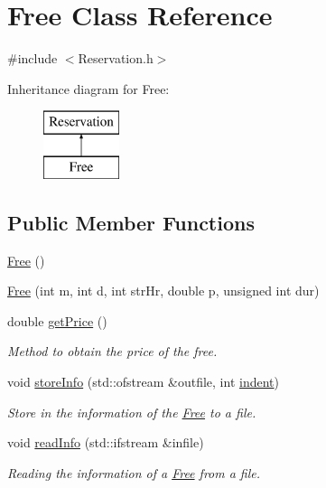 \hypertarget{class_free}{}\section{Free Class Reference}
\label{class_free}


{\ttfamily \#include $<$Reservation.\+h$>$}

Inheritance diagram for Free\+:\begin{figure}[H]
\begin{center}
\leavevmode
\includegraphics[height=2.000000cm]{class_free}
\end{center}
\end{figure}
\subsection*{Public Member Functions}
\begin{DoxyCompactItemize}
\item 
\mbox{\hyperlink{class_free_a4a847fee0a934284fc4581282706e885}{Free}} ()
\item 
\mbox{\hyperlink{class_free_add02897be555344a947ad860ab73e679}{Free}} (int m, int d, int str\+Hr, double p, unsigned int dur)
\item 
double \mbox{\hyperlink{class_free_a229f009a7535eeba0a6ff4495de8c6bf}{get\+Price}} ()
\begin{DoxyCompactList}\small\item\em Method to obtain the price of the free. \end{DoxyCompactList}\item 
void \mbox{\hyperlink{class_free_a5eec9da16ebf4f388d16dd270bd93b64}{store\+Info}} (std\+::ofstream \&outfile, int \mbox{\hyperlink{class_reservation_a480981ed050bae19bc74bbb0bbb459f9}{indent}})
\begin{DoxyCompactList}\small\item\em Store in the information of the \mbox{\hyperlink{class_free}{Free}} to a file. \end{DoxyCompactList}\item 
void \mbox{\hyperlink{class_free_ad1023c825c9790edf0797e2e69dd2fcf}{read\+Info}} (std\+::ifstream \&infile)
\begin{DoxyCompactList}\small\item\em Reading the information of a \mbox{\hyperlink{class_free}{Free}} from a file. \end{DoxyCompactList}\end{DoxyCompactItemize}
